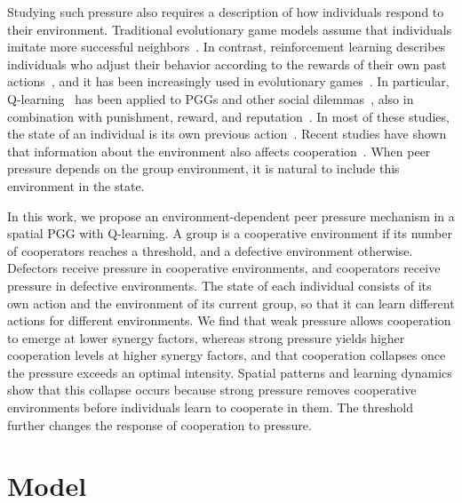 \documentclass[%
  aip,cha,
  amsmath,amssymb,
  reprint,
  floatfix,
  article-title,
]{revtex4-2}
\begin{document}
Studying such pressure also requires a description of how individuals respond to their environment.
Traditional evolutionary game models assume that individuals imitate more successful neighbors~\cite{szabo2007evolutionary,traulsen2010human}.
In contrast, reinforcement learning describes individuals who adjust their behavior according to the rewards of their own past actions~\cite{young2009learning,sutton2018reinforcement}, and it has been increasingly used in evolutionary games~\cite{xie2026reinforcement,zheng2026brief}.
In particular, Q-learning~\cite{watkins1992qlearning} has been applied to PGGs and other social dilemmas~\cite{zheng2024evolution,shi2024model,wang2025spatial,mintz2025evolutionary,li2025cooperation}, also in combination with punishment, reward, and reputation~\cite{zhao2024emergence,wang2023synergistic,ren2024interaction,shen2024adaptive,li2026reputation}.
In most of these studies, the state of an individual is its own previous action~\cite{wang2022levy,fan2022incorporating,du2026shaping}.
Recent studies have shown that information about the environment also affects cooperation~\cite{kleshnina2023effect,lv2025reinforcement,li2025environmental}.
When peer pressure depends on the group environment, it is natural to include this environment in the state.

In this work, we propose an environment-dependent peer pressure mechanism in a spatial PGG with Q-learning.
A group is a cooperative environment if its number of cooperators reaches a threshold, and a defective environment otherwise.
Defectors receive pressure in cooperative environments, and cooperators receive pressure in defective environments.
The state of each individual consists of its own action and the environment of its current group, so that it can learn different actions for different environments.
We find that weak pressure allows cooperation to emerge at lower synergy factors, whereas strong pressure yields higher cooperation levels at higher synergy factors, and that cooperation collapses once the pressure exceeds an optimal intensity.
Spatial patterns and learning dynamics show that this collapse occurs because strong pressure removes cooperative environments before individuals learn to cooperate in them.
The threshold further changes the response of cooperation to pressure.


\section{Model}\label{sec:model}
\end{document}
